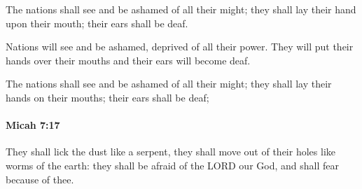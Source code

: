 			\begin{versebox}
					\item[BHS] 
					\item[LXX] 
					\item[ASV] The nations shall see and be ashamed of all their might; they shall lay their hand upon their mouth; their ears shall be deaf.
					\item[NIV] Nations will see and be ashamed, deprived of all their power. They will put their hands over their mouths and their ears will become deaf.
					\item[NRSV] The nations shall see and be ashamed of all their might; they shall lay their hands on their mouths; their ears shall be deaf;
			\end{versebox}

		\paragraph{Micah 7:17} %
			\label{MICAH-7-17}

			They shall lick the dust like a serpent, they shall move out of their holes like worms of the earth: they shall be afraid of the LORD our God, and shall fear because of thee.

